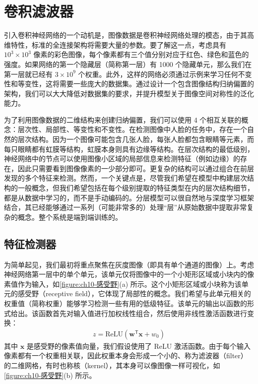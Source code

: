 \documentclass[../../main.tex]{subfiles}
\begin{document}
\section{卷积滤波器}\label{section:ch10-卷积滤波器}

引入卷积神经网络的一个动机是，图像数据是卷积神经网络处理的模态，由于其高维特性，标准的全连接架构将需要大量的参数。要了解这一点，考虑具有 $10^3\times 10^3$ 像素的彩色图像，每个像素都有三个值分别对应于红色、绿色和蓝色的强度。如果网络的第一个隐藏层（简称第一层）有 1000 个隐藏单元，那么我们在第一层就已经有 $3\times 10^9$ 个权重。此外，这样的网络必须通过示例来学习任何不变性和等变性，这将需要一些庞大的数据集。通过设计一个包含图像结构归纳偏置的架构，我们可以大大降低对数据集的要求，并提升模型关于图像空间对称性的泛化能力。

为了利用图像数据的二维结构来创建归纳偏置，我们可以使用 4 个相互关联的概念：层次性、局部性、等变性和不变性。在检测图像中人脸的任务中，存在一个自然的层次结构。因为一个图像可能包含几张人脸，每张人脸都包含眼睛等元素，而每只眼睛都有虹膜等结构，虹膜本身则具有边缘等结构。在层次结构的最低级别，神经网络中的节点可以使用图像小区域的局部信息来检测特征（例如边缘）的存在，因此只需要看到图像像素的一少部分即可。更复杂的结构可以通过组合在前层发现的多个特征来检测。然而，一个关键点是，尽管我们希望在模型中构建层次结构的一般概念，但我们希望包括在每个级别提取的特征类型在内的层次结构细节，都是从数据中学习的，而不是手动编码的。分层模型可以很自然地与深度学习框架结合，其已经能够通过一系列（可能非常多的）处理“层”从原始数据中提取非常复杂的概念。整个系统是端到端训练的。

\subsection{特征检测器}\label{subsection:ch10-特征检测器}

为简单起见，我们最初将重点聚焦在灰度图像（即具有单个通道的图像）上。考虑神经网络第一层中的单个单元，该单元仅将图像中的一个小矩形区域或小块内的像素值作为输入，如\cref{figure:ch10-感受野}(a) 所示。这个小矩形区域或小块称为该单元的感受野（receptive field），它体现了局部性的概念。我们希望与此单元相关的权重值（简称权重）能够学习检测一些有用的低级特征。该单元的输出以函数的形式给出。该函数首先对输入值进行加权线性组合，然后使用非线性激活函数进行变换：
\begin{align}
  z = \mathrm{ReLU}\left(\mathbf{w}^{\mathsf{T}}\mathbf{x} + w_0\right)
  \label{align:ch10-隐藏单元输出}
\end{align}
其中 $\mathbf{x}$ 是感受野的像素值向量，我们假设使用了 ReLU 激活函数。由于每个输入像素都有一个权重相关联，因此权重本身会形成一个小的、称为滤波器（filter）的二维网格，有时也称核（kernel），其本身可以像图像一样可视化，如\cref{figure:ch10-感受野}(b) 所示。
\end{document}
